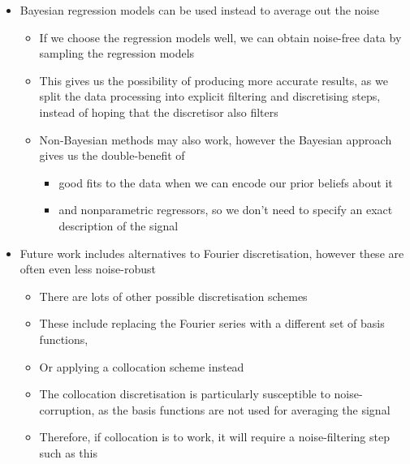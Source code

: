 \documentclass[11pt]{article}
\begin{document}
\begin{itemize}
\item Bayesian regression models can be used instead to average out the noise
\begin{itemize}
\item If we choose the regression models well, we can obtain noise-free data by sampling the regression models
\item This gives us the possibility of producing more accurate results, as we split the data processing into explicit filtering and discretising steps, instead of hoping that the discretisor also filters
\item Non-Bayesian methods may also work, however the Bayesian approach gives us the double-benefit of
\begin{itemize}
\item good fits to the data when we can encode our prior beliefs about it
\item and nonparametric regressors, so we don't need to specify an exact description of the signal
\end{itemize}
\end{itemize}

\item Future work includes alternatives to Fourier discretisation, however these are often even less noise-robust
\begin{itemize}
\item There are lots of other possible discretisation schemes
\item These include replacing the Fourier series with a different set of basis functions,
\item Or applying a collocation scheme instead
\item The collocation discretisation is particularly susceptible to noise-corruption, as the basis functions are not used for averaging the signal
\item Therefore, if collocation is to work, it will require a noise-filtering step such as this
\end{itemize}
\end{itemize}
\end{document}
